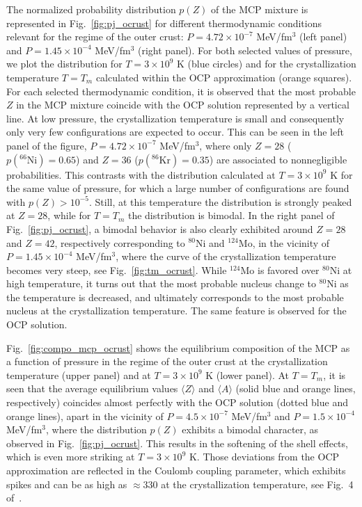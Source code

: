 The normalized probability distribution $p(Z)$ of the MCP mixture is 
represented in Fig.~\ref{fig:pj_ocrust} for different thermodynamic conditions 
relevant for the regime of the outer crust: $P = 4.72\times 10^{-7}$ MeV/fm$^3$
(left panel) and $P=1.45\times 10^{-4}$ MeV/fm$^3$ (right panel). For both 
selected values of pressure, we plot the distribution for $T=3\times
10^9$ K (blue circles) and for the crystallization temperature $T=T_m$ 
calculated within the OCP approximation (orange squares).
For each selected thermodynamic condition, it is observed that the most
probable $Z$ in the MCP mixture coincide with the OCP solution represented by 
a vertical line.
At low pressure, the crystallization temperature is small and consequently only 
very few configurations are expected to occur. This can be seen in the left
panel of the figure, $P = 4.72\times 10^{-7}$ MeV/fm$^3$, where only $Z=28$
($p(^{66}\text{Ni}) = 0.65$) and $Z=36$ ($p(^{86}\text{Kr})=0.35$) are 
associated to nonnegligible probabilities. This contrasts with the 
distribution calculated 
at $T=3\times 10^9$ K for the same value of pressure, for which a large number 
of configurations are found with $p(Z) > 10^{-5}$. Still, at this temperature 
the distribution is strongly peaked at $Z=28$, while for $T=T_m$ the 
distribution is bimodal. 
In the right panel of Fig.~\ref{fig:pj_ocrust}, a bimodal behavior is also 
clearly exhibited around $Z=28$ and $Z=42$, respectively corresponding to 
$^{80}$Ni and $^{124}$Mo, in the vicinity of $P = 1.45\times 10^{-4}$ 
MeV/fm$^3$, where the curve of the crystallization temperature becomes very 
steep, see Fig.~\ref{fig:tm_ocrust}. 
While $^{124}$Mo is favored over $^{80}$Ni at high temperature,
it turns out that the most probable nucleus change to $^{80}$Ni as the
temperature is decreased, and ultimately corresponds to the most probable
nucleus at the crystallization temperature. The same feature is observed for 
the OCP solution.

Fig.~\ref{fig:compo_mcp_ocrust} shows the equilibrium composition of the MCP as
a function of pressure in the regime of the outer crust at the crystallization
temperature (upper panel) and at $T=3\times 10^9$ K (lower panel). At $T=T_m$, 
it is seen that the average equilibrium values $\langle Z\rangle$ and $\langle
A\rangle$ (solid blue and orange lines, respectively) coincides almost 
perfectly with the OCP solution (dotted blue and orange lines), apart in the
vicinity of $P=4.5\times 10^{-7}$ MeV/fm$^3$ and $P=1.5\times 10^{-4}$
MeV/fm$^3$, where the distribution $p(Z)$ exhibits a bimodal character, as
observed in Fig.~\ref{fig:pj_ocrust}. This results in the softening of the 
shell effects, which is even more striking at $T=3\times 10^9$ K. Those 
deviations from the OCP approximation are reflected in the Coulomb coupling 
parameter, which exhibits spikes and can be as high as $\approx 330$ at the
crystallization temperature, see Fig.~4 of~\cite{Fantina2020}.

